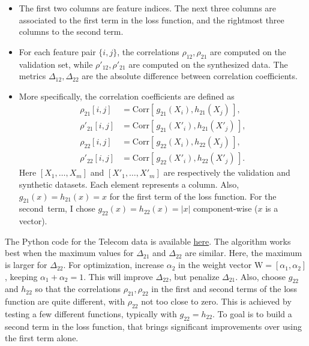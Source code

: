 \documentclass[oneside,10pt]{book}
\renewcommand{\arraystretch}{1.4} %
\begin{document}
\begin{itemize}
\item The first two columns are feature indices. The next three columns are associated to the first term in the loss function, and the rightmost three columns to the second term.
\item For each feature pair $\{i, j\}$, the correlations $\rho_{12},\rho_{21}$ are computed on the validation set, while
$\rho'_{12},\rho'_{21}$ are computed on the synthesized data. The metrics $\Delta_{12}, \Delta_{22}$ are the absolute difference between
 correlation coefficients. 
\item More specifically, the correlation coefficients are defined as
\begin{align}
\rho_{21}[i, j] & =\text{Corr}[\, g_{21}(X_i), h_{21}(X_j) \,], \nonumber \\
\rho'_{21}[i, j] & =\text{Corr}[\, g_{21}(X'_i), h_{21}(X'_j) \,], \nonumber\\
\rho_{22}[i, j] & =\text{Corr}[\, g_{22}(X_i), h_{22}(X_j) \,], \nonumber \\
\rho'_{22}[i, j] & =\text{Corr}[\, g_{22}(X'_i), h_{22}(X'_j) \,].\nonumber
\end{align}
Here $[X_1,\dots,X_m]$ and $[X'_1,\dots,X'_m]$ are respectively the validation and synthetic datasets. Each element represents a column. Also,  $g_{21}(x) = h_{21}(x) = x$ for the first term of the loss function. For the second~term,  I chose $g_{22}(x) = h_{22}(x) = | x |$ component-wise ($x$ is a vector).
\end{itemize}\vspace{1ex}





The Python code for the Telecom data is available \href{https://github.com/VincentGranville/Main/blob/main/DeepResampling_telecom.py}{here}. The algorithm works best when the maximum values for $\Delta_{21}$ and $\Delta_{22}$ are similar. Here, the maximum is larger for
 $\Delta_{22}$. For optimization, increase $\alpha_2$ in the weight vector $\text{W} = [\alpha_1, \alpha_2]$, keeping $\alpha_1 + \alpha_2 = 1$. This will
 improve $\Delta_{22}$, but penalize $\Delta_{21}$.
Also, choose $g_{22}$ and $h_{22}$ so that the correlations $\rho_{21}, \rho_{22}$ in the first and second terms of the loss function are quite different, with $\rho_{22}$ not too close to zero. This is achieved by testing a few different functions, typically with $g_{22} = h_{22}$. To goal is to build a second term in the loss function, that
 brings significant improvements over using the first term alone.
\end{document}
